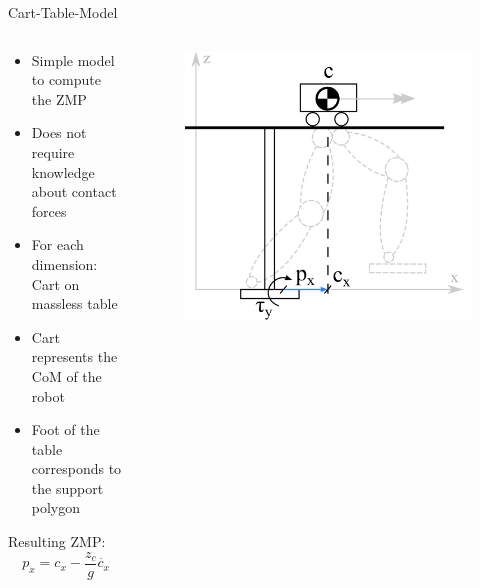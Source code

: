 \begin{frame}{Cart-Table-Model}

\begin{columns}
\begin{column}{0.5\textwidth}
\begin{itemize}
\item Simple model to compute the ZMP
\item Does not require knowledge about contact forces
\item For each dimension: Cart on massless table
\item Cart represents the CoM of the robot
\item Foot of the table corresponds to the support polygon
\end{itemize}

Resulting ZMP:
\begin{equation} \label{eq:zmp-x}
p_x = c_x - \frac{z_c}{g} \ddot{c_x}
\end{equation}
\end{column}

\begin{column}{0.5\textwidth}
\begin{figure}
  \begin{center}
     \includegraphics[width=\textwidth]{images/carttable.png}
  \end{center}
\end{figure}
\end{column}
\end{columns}

\end{frame}

